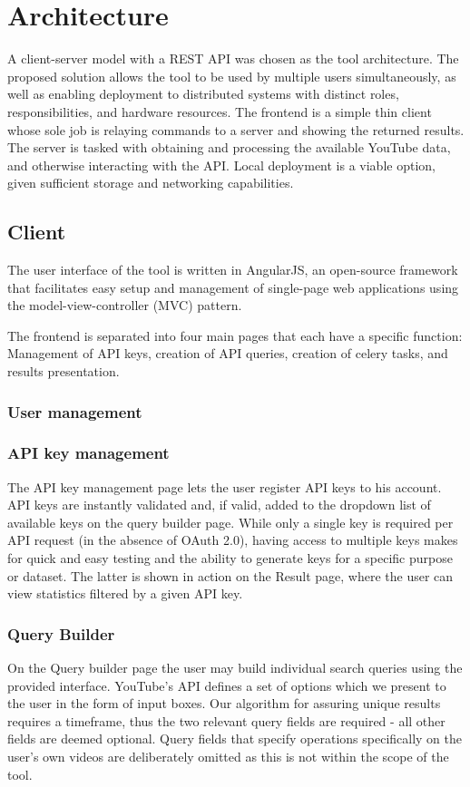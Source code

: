 \section{Architecture}
A client-server model with a REST API was chosen as the tool architecture. The
proposed solution allows the tool to be used by multiple users simultaneously,
as well as enabling deployment to distributed systems with distinct roles,
responsibilities, and hardware resources.
The frontend is a simple thin client whose sole job is relaying commands to a
server and showing the returned results. The server is tasked with obtaining
and processing the available YouTube data, and otherwise interacting with the
API.
Local deployment is a viable option, given sufficient storage and networking
capabilities.


\subsection{Client}
The user interface of the tool is written in AngularJS, an open-source framework
that facilitates easy setup and management of single-page web applications using
the model-view-controller (MVC) pattern.~\cite{architecture:angularjs}

The frontend is separated into four main pages that each have a specific
function: Management of API keys, creation of API queries, creation of celery
tasks, and results presentation.


\subsubsection{User management}


\subsubsection{API key management}
The API key management page lets the user register API keys to his account.
API keys are instantly validated and, if valid, added to the dropdown list of
available keys on the query builder page.
While only a single key is required per API request (in the absence of OAuth
2.0), having access to multiple keys makes for quick and easy testing and the
ability to generate keys for a specific purpose or dataset. The latter is
shown in action on the Result page, where the user can view statistics filtered
by a given API key. %


\subsubsection{Query Builder}
On the Query builder page the user may build individual search queries using
the provided interface. YouTube's API defines a set of options which we present
to the user in the form of input boxes. Our algorithm for assuring unique
results requires a timeframe, thus the two relevant query fields are required - 
all other fields are deemed optional. Query fields that specify operations
specifically on the user's own videos are deliberately omitted as this is
not within the scope of the tool.

